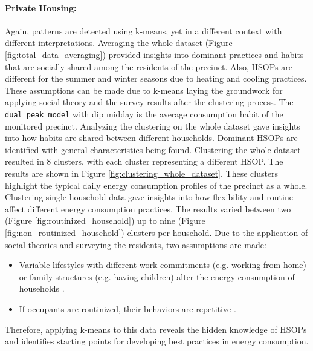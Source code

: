 \paragraph*{Private Housing:}
Again, patterns are detected using k-means, yet in a different context with different interpretations.
Averaging the whole dataset (Figure \ref{fig:total_data_averaging}) provided insights into dominant practices and habits that are socially shared among the residents of the precinct.
Also, HSOPs are different for the summer and winter seasons due to heating and cooling practices.
These assumptions can be made due to k-means laying the groundwork for applying social theory and the survey results after the clustering process.
The \texttt{dual peak model} with dip midday is the average consumption habit of the monitored precinct.
Analyzing the clustering on the whole dataset gave insights into how habits are shared between different households.
Dominant HSOPs are identified with general characteristics being found.
Clustering the whole dataset resulted in 8 clusters, with each cluster representing a different HSOP.
The results are shown in Figure \ref{fig:clustering_whole_dataset}.
These clusters highlight the typical daily energy consumption profiles of the precinct as a whole.
Clustering single household data gave insights into how flexibility and routine affect different energy consumption practices.
The results varied between two (Figure \ref{fig:routinized_household}) up to nine (Figure \ref{fig:non_routinized_household}) clusters per household.
Due to the application of social theories and surveying the residents, two assumptions are made:
\begin{itemize}
    \item Variable lifestyles with different work commitments (e.g. working from home) or family structures (e.g. having children) alter the energy consumption of households \cite{KUR-HBP}.
    \item If occupants are routinized, their behaviors are repetitive \cite{BRE-EWP}.
\end{itemize}
Therefore, applying k-means to this data reveals the hidden knowledge of HSOPs and identifies starting points for developing best practices in energy consumption.

